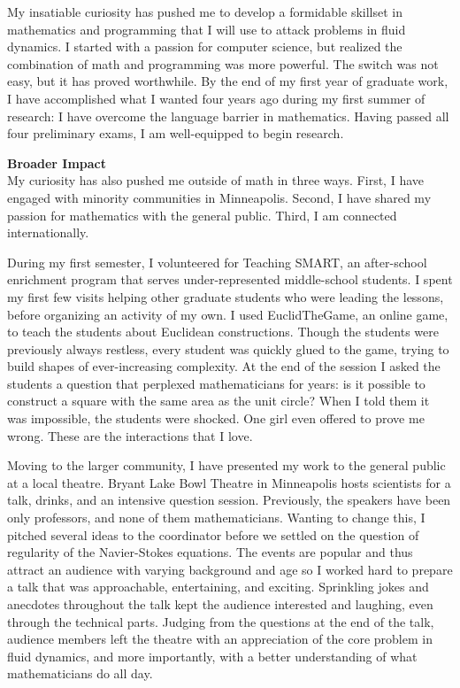 \documentclass[12pt]{article}
\begin{document}
My insatiable curiosity has pushed me to develop a formidable skillset in mathematics and programming that I will use to attack problems in fluid dynamics. I started with a passion for computer science, but realized the combination of math and programming was more powerful. The switch was not easy, but it has proved worthwhile. By the end of my first year of graduate work, I have accomplished what I wanted four years ago during my first summer of research: I have overcome the language barrier in mathematics. Having passed all four preliminary exams, I am well-equipped to begin research.

\textbf{Broader Impact}\\
My curiosity has also pushed me outside of math in three ways. First, I have engaged with minority communities in Minneapolis. Second, I have shared my passion for mathematics with the general public. Third, I am connected internationally. 

During my first semester, I volunteered for Teaching SMART, an after-school enrichment program that serves under-represented middle-school students. I spent my first few visits helping other graduate students who were leading the lessons, before organizing an activity of my own. I used EuclidTheGame, an online game, to teach the students about Euclidean constructions. Though the students were previously always restless, every student was quickly glued to the game, trying to build shapes of ever-increasing complexity. At the end of the session I asked the students a question that perplexed mathematicians for years: is it possible to construct a square with the same area as the unit circle? When I told them it was impossible, the students were shocked. One girl even offered to prove me wrong. These are the interactions that I love. 

Moving to the larger community, I have presented my work to the general public at a local theatre. Bryant Lake Bowl Theatre in Minneapolis hosts scientists for a talk, drinks,  and an intensive question session. Previously, the speakers have been only professors, and none of them mathematicians. Wanting to change this, I pitched several ideas to the coordinator before we settled on the question of regularity of the Navier-Stokes equations. The events are popular and thus attract an audience with varying background and age so I worked hard to prepare a talk that was approachable, entertaining, and exciting. Sprinkling jokes and anecdotes throughout the talk kept the audience interested and laughing, even through the technical parts. Judging from the questions at the end of the talk, audience members left the theatre with an appreciation of the core problem in fluid dynamics, and more importantly, with a better understanding of what mathematicians do all day.
\end{document}
